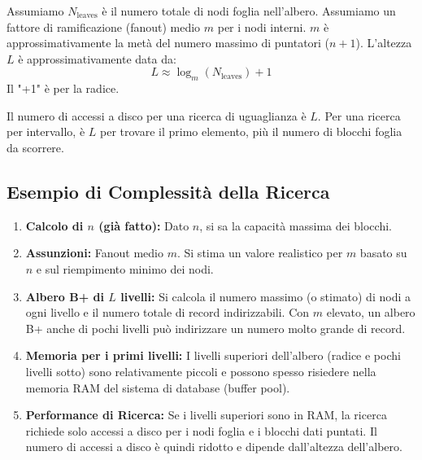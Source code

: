 Assumiamo $N_{\text{leaves}}$ è il numero totale di nodi foglia nell'albero.
Assumiamo un fattore di ramificazione (fanout) medio $m$ per i nodi interni. $m$ è approssimativamente la metà del numero massimo di puntatori ($n+1$).
L'altezza $L$ è approssimativamente data da:
\[ L \approx \log_{m}(N_{\text{leaves}}) + 1 \]
Il "+1" è per la radice.

Il numero di accessi a disco per una ricerca di uguaglianza è $L$. Per una ricerca per intervallo, è $L$ per trovare il primo elemento, più il numero di blocchi foglia da scorrere.

\subsection{Esempio di Complessità della Ricerca}
\begin{enumerate}
    \item \textbf{Calcolo di $n$ (già fatto):} Dato $n$, si sa la capacità massima dei blocchi.
    \item \textbf{Assunzioni:} Fanout medio $m$. Si stima un valore realistico per $m$ basato su $n$ e sul riempimento minimo dei nodi.
    \item \textbf{Albero B+ di $L$ livelli:} Si calcola il numero massimo (o stimato) di nodi a ogni livello e il numero totale di record indirizzabili. Con $m$ elevato, un albero B+ anche di pochi livelli può indirizzare un numero molto grande di record.
    \item \textbf{Memoria per i primi livelli:} I livelli superiori dell'albero (radice e pochi livelli sotto) sono relativamente piccoli e possono spesso risiedere nella memoria RAM del sistema di database (buffer pool).
    \item \textbf{Performance di Ricerca:} Se i livelli superiori sono in RAM, la ricerca richiede solo accessi a disco per i nodi foglia e i blocchi dati puntati. Il numero di accessi a disco è quindi ridotto e dipende dall'altezza dell'albero.
\end{enumerate}

